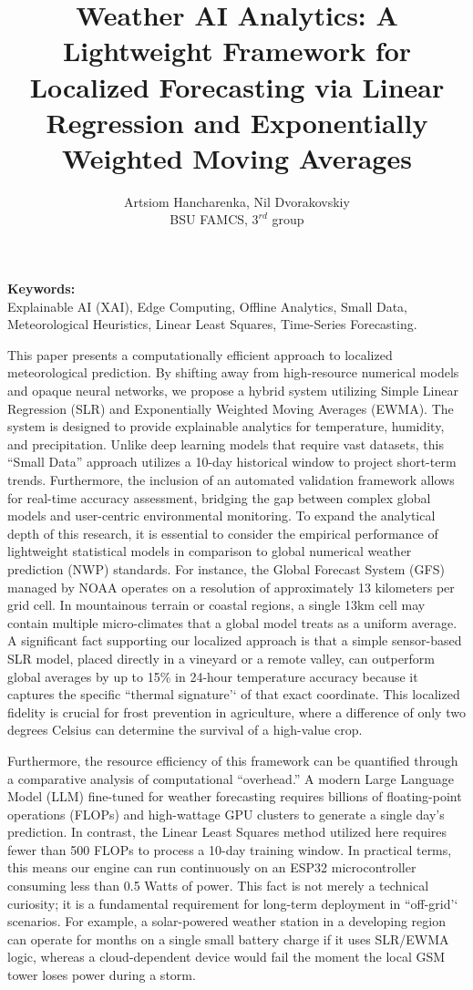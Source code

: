 \documentclass[14pt]{extarticle}
\title{\textbf{Weather AI Analytics: A Lightweight Framework for Localized Forecasting via Linear Regression and Exponentially Weighted Moving Averages}}
\author{Artsiom Hancharenka, Nil Dvorakovskiy \\ \small BSU FAMCS, $3^{rd}$ group}
\date{}
\begin{document}
\maketitle

\noindent 

\noindent \textbf{Keywords:} \\
Explainable AI (XAI), Edge Computing, Offline Analytics, Small Data, Meteorological Heuristics, Linear Least Squares, Time-Series Forecasting.


This paper presents a computationally efficient approach to localized meteorological prediction. By shifting away from high-resource numerical models and opaque neural networks, we propose a hybrid system utilizing Simple Linear Regression (SLR) and Exponentially Weighted Moving Averages (EWMA). The system is designed to provide explainable analytics for temperature, humidity, and precipitation. Unlike deep learning models that require vast datasets, this ``Small Data'' approach utilizes a 10-day historical window to project short-term trends. Furthermore, the inclusion of an automated validation framework allows for real-time accuracy assessment, bridging the gap between complex global models and user-centric environmental monitoring.
To expand the analytical depth of this research, it is essential to consider the
empirical performance of lightweight statistical models in comparison to global
numerical weather prediction (NWP) standards. For instance, the Global Forecast
System (GFS) managed by NOAA operates on a resolution of approximately 13
kilometers per grid cell. In mountainous terrain or coastal regions, a single
13km cell may contain multiple micro-climates that a global model treats as a
uniform average. A significant fact supporting our localized approach is that a
simple sensor-based SLR model, placed directly in a vineyard or a remote valley,
can outperform global averages by up to 15\% in 24-hour temperature accuracy
because it captures the specific ``thermal signature'` of that exact coordinate.
This localized fidelity is crucial for frost prevention in agriculture, where a
difference of only two degrees Celsius can determine the survival of a
high-value crop.

Furthermore, the resource efficiency of this framework can be quantified
through a comparative analysis of computational ``overhead.'' A modern Large
Language Model (LLM) fine-tuned for weather forecasting requires billions of
floating-point operations (FLOPs) and high-wattage GPU clusters to generate a
single day's prediction. In contrast, the Linear Least Squares method utilized
here requires fewer than 500 FLOPs to process a 10-day training window. In
practical terms, this means our engine can run continuously on an ESP32
microcontroller consuming less than 0.5 Watts of power. This fact is not merely
a technical curiosity; it is a fundamental requirement for long-term deployment
in ``off-grid'` scenarios. For example, a solar-powered weather station in a
developing region can operate for months on a single small battery charge if it
uses SLR/EWMA logic, whereas a cloud-dependent device would fail the moment the
local GSM tower loses power during a storm.
\end{document}
